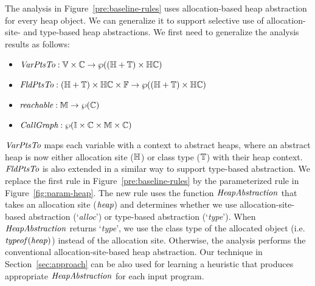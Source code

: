 The analysis in Figure~\ref{pre:baseline-rules} uses allocation-based heap abstraction for every heap object.
We can generalize it to support selective use of allocation-site- and type-based heap abstractions. We first need to generalize the analysis results as follows:
\begin{itemize}
	\item $\textit{VarPtsTo}:\mathbb{V} \times \mathbb{C} \to \wp((\mathbb{H} + \mathbb{T}) \times \mathbb{H}\mathbb{C})$
	\item $\textit{FldPtsTo}:(\mathbb{H} + \mathbb{T}) \times \mathbb{H}\mathbb{C} \times \mathbb{F} \to \wp((\mathbb{H} + \mathbb{T}) \times \mathbb{H}\mathbb{C})$
\item $\textit{reachable}: \mathbb{M} \to \wp(\mathbb{C})$
\item $\textit{CallGraph}: \wp(\mathbb{I} \times \mathbb{C} \times \mathbb{M} \times \mathbb{C})$
\end{itemize}
$\textit{VarPtsTo}$ maps each variable with a context to abstract heaps, where an abstract heap is now either allocation site ($\mathbb{H}$) or class type ($\mathbb{T}$) with their heap context. $\textit{FldPtsTo}$ is also extended in a similar way to support type-based abstraction.
We replace the first rule in Figure~\ref{pre:baseline-rules} by the parameterized rule in Figure~\ref{fig:param-heap}.
The new rule uses the function ${\it HeapAbstraction}$ that takes an allocation site (${\it heap}$) and determines whether we use allocation-site-based abstraction (`{\it alloc}') or type-based abstraction (`{\it type}'). When ${\it HeapAbstraction}$ returns `{\it type}', we use the class type of the allocated object (i.e. ${\it typeof}({\it heap})$) instead of the allocation site. Otherwise, the analysis performs the conventional allocation-site-based heap abstraction.
Our technique in Section~\ref{sec:approach} can be also used for learning a heuristic that produces appropriate ${\it HeapAbstraction}$ for each input program.







